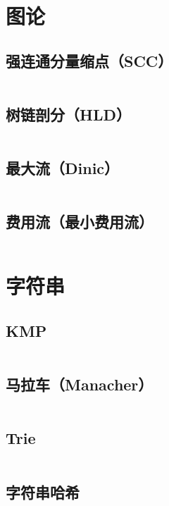 \documentclass[a4paper]{article}
\begin{document}
\begin{spacing}{0.6}
\newpage
\section{图论}

\subsection{强连通分量缩点（SCC）}
\inputminted{cpp}{\detokenize{Template/图论/01 - 强连通分量缩点（SCC）.txt}}

\newpage
\subsection{树链剖分（HLD）}
\inputminted{cpp}{\detokenize{Template/图论/02 - 树链剖分（HLD）.txt}}

\newpage
\subsection{最大流（Dinic）}
\inputminted{cpp}{\detokenize{Template/图论/03 - 最大流（Dinic）.txt}}

\newpage
\subsection{费用流（最小费用流）}
\inputminted{cpp}{\detokenize{Template/图论/04 - 费用流（最小费用流）.txt}}

\newpage
\section{字符串}

\subsection{KMP}
\inputminted{cpp}{\detokenize{Template/字符串/01 - kmp.txt}}

\subsection{马拉车（Manacher）}
\inputminted{cpp}{\detokenize{Template/字符串/02 - 马拉车（Manacher）.txt}}

\subsection{Trie}
\inputminted{cpp}{\detokenize{Template/字符串/03 - Trie.txt}}

\subsection{字符串哈希}
\inputminted{cpp}{\detokenize{Template/字符串/04 - 字符串哈希.txt}}

\newpage

\end{spacing}
\end{document}
